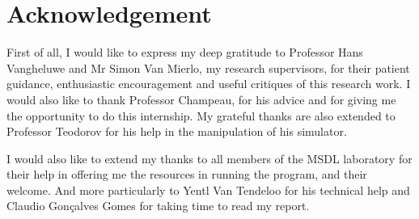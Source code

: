 
\chapter*{Acknowledgement}
First of all, I would like to express my deep gratitude to Professor Hans Vangheluwe and Mr Simon Van Mierlo, my research supervisors, for their patient guidance, enthusiastic encouragement and useful critiques of this research work. I would also like to thank Professor Champeau, for his advice and for giving me the opportunity to do this internship. My grateful thanks are also extended to Professor Teodorov for his help in the manipulation of his simulator.

I would also like to extend my thanks to all members of the MSDL laboratory for their help in offering me the resources in running the program, and their welcome. And more particularly to Yentl Van Tendeloo for his technical help and Claudio Gonçalves Gomes for taking time to read my report.


\newpage

